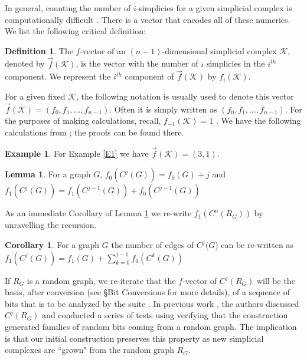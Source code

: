 \documentclass[oneside,12pt]{amsart}
\theoremstyle{definition}
\newtheorem{Definition}[Theorem]{Definition}
\newtheorem{Lemma}[Theorem]{Lemma}
\newtheorem{Corollary}[Theorem]{Corollary}
\newtheorem{Example}[Theorem]{Example}
\numberwithin{equation}{section}
\begin{document}
In general, counting the number of $i$-simplicies for a given simplicial complex is computationally difficult \cite{KP}.  There is a vector that encodes all of these numerics.  We list the following critical definition:

\begin{Definition}\label{fvector}
The $f$-vector of an $(n-1)$-dimensional simplicial complex $\mathcal{K}$, denoted by $\overrightarrow{f}(\mathcal{K})$, is the vector with the number of $i$ simplicies in the $i^{th}$ component. We represent the $i^{th}$ component of $\overrightarrow{f}(\mathcal{K})$ by $f_{i}(\mathcal{K})$.
\end{Definition}

For a given fixed $\mathcal{K}$, the following notation is usually used to denote this vector $\overrightarrow{f}(\mathcal{K}) = (f_0,f_1,\ldots,f_{n-1})$. Often it is simply written as $(f_0,f_1,\ldots,f_{n-1})$. For the purposes of making calculations, recall, $f_{-1}(\mathcal{K}) = 1$ \cite{BP1}.  We have the following calculations from \cite{ALDH}; the proofs can be found there.

\begin{Example}
For Example \ref{E1} we have $\overrightarrow{f}(\mathcal{K})=(3,1)$.
\end{Example}

\begin{Lemma} \label{Count on Cone}
For a graph $G$, $f_0(C^j(G)) = f_0(G) + j$ and $f_1(C^j(G)) =  f_1(C^{j-1}(G)) +  f_0(C^{j-1}(G))$
\end{Lemma}

As an immediate Corollary of Lemma \ref{Count on Cone} we re-write $f_1(C^n(R_G))$ by unravelling the recursion.

\begin{Corollary}\label{recursion}
For a graph $G$ the number of edges of $C^j(G$) can be re-written as $f_1(C^j(G)) = f_1(G) + \sum_{k = 0}^ {j-1} f_0(C^k(G))$
\end{Corollary}

If $R_G$ is a random graph, we re-iterate that the $f$-vector of $C^j(R_G)$ will be the basis, after conversion (see \S Bit Conversions for more details), of  a sequence of bits that is to be analyzed by the suite \cite{NIST}.  In previous work \cite{ALDH}, the authors discussed $C^j(R_G)$ and conducted a series of tests using \cite{NIST} verifying that the construction generated families of random bits coming from a random graph.  The implication is that our initial construction preserves this property as new simplicial complexes are ``grown" from the random graph $R_G$.
\end{document}
